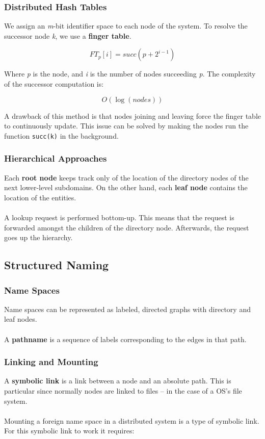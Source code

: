 \documentclass{article}
\begin{document}
\subsubsection{Distributed Hash Tables}
We assign an \textit{m}-bit identifier space to each node of the system. To resolve the successor node \textit{k}, we use a \textbf{finger table}.

\[ FT_p[i] = succ(p + 2^{i-1}) \]

\noindent Where \textit{p} is the node, and \textit{i} is the number of nodes succeeding \textit{p}. The complexity of the successor computation is:

\[ O(\log (nodes)) \]

\noindent A drawback of this method is that nodes joining and leaving force the finger table to continuously update. This issue can be solved by making the nodes run the function \verb|succ(k)| in the background.

\subsubsection{Hierarchical Approaches}
Each \textbf{root node} keeps track only of the location of the directory nodes of the next lower-level subdomains. On the other hand, each \textbf{leaf node} contains the location of the entities. \\ \\
A lookup request is performed bottom-up. This means that the request is forwarded amongst the children of the directory node. Afterwards, the request goes up the hierarchy.

\subsection{Structured Naming}
\subsubsection{Name Spaces}
Name spaces can be represented as labeled, directed graphs with directory and leaf nodes. \\ \\
A \textbf{pathname} is a sequence of labels corresponding to the edges in that path.

\subsubsection{Linking and Mounting}
A \textbf{symbolic link} is a link between a node and an absolute path. This is particular since normally nodes are linked to files -- in the case of a OS's file system. \\ \\
Mounting a foreign name space in a distributed system is a type of symbolic link. For this symbolic link to work it requires:
\end{document}
